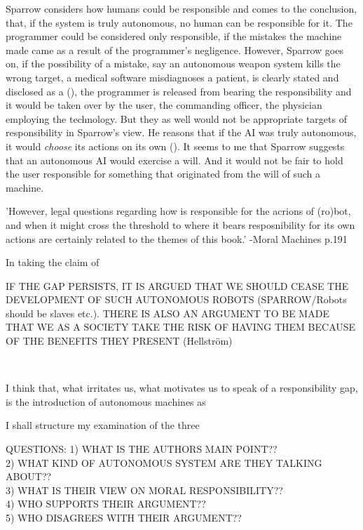 \documentclass{article}
\begin{document}
Sparrow considers how humans could be responsible and comes to the conclusion,
that, if the system is truly autonomous, no human can be responsible for it. The
programmer could be considered only responsible, if the mistakes the machine
made came as a result of the programmer's negligence. However, Sparrow goes on,
if the possibility of a mistake, say an autonomous weapon system kills the wrong
target, a medical software misdiagnoses a patient, is clearly stated and
disclosed as a  (\cite[p. 69]{sparrow2007killer}),
the programmer is released from bearing the responsibility and it would be taken
over by the user, the commanding officer, the physician employing the
technology. But they as well would not be appropriate targets of responsibility
in Sparrow's view. He reasons that if the AI was truly autonomous, it would
\textit{choose} its actions on its own (\cite[p. 70]{sparrow2007killer}). It
seems to me that Sparrow suggests that an autonomous AI would exercise a will.
And it would not be fair to hold the user responsible for something that
originated from the will of such a machine.

'However, legal questions regarding how is responsible for the acrions of
(ro)bot, and when it might cross the threshold to where it bears resposnibility
for its own actions are certainly related to the themes of this book.' -Moral
Machines p.191

In taking the
claim of 

IF THE GAP PERSISTS, IT IS ARGUED THAT WE SHOULD CEASE THE DEVELOPMENT OF SUCH
AUTONOMOUS ROBOTS (SPARROW/Robots should be slaves etc.). THERE IS ALSO AN
ARGUMENT TO BE MADE THAT WE AS A SOCIETY TAKE THE RISK OF HAVING THEM BECAUSE OF
THE BENEFITS THEY PRESENT (Hellström)

~~~~~~~~~~~~~~~~~~~~~

I think that, what irritates us, what motivates us to speak of a responsibility
gap, is the introduction of autonomous machines as

I shall structure my examination of the three

QUESTIONS: 
1) WHAT IS THE AUTHORS MAIN POINT??\\
2) WHAT KIND OF AUTONOMOUS SYSTEM ARE THEY TALKING ABOUT??\\
3) WHAT IS THEIR VIEW ON MORAL RESPONSIBILITY??\\
4) WHO SUPPORTS THEIR ARGUMENT??\\
5) WHO DISAGREES WITH THEIR ARGUMENT??\\
\end{document}
